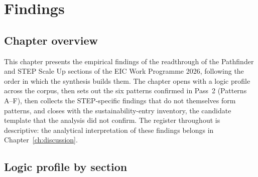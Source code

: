 %
%
\chapter{Findings}
\label{ch:results}

\section*{Chapter overview}

This chapter presents the empirical findings of the readthrough of the
Pathfinder and STEP Scale Up sections of the EIC Work Programme 2026,
following the order in which the synthesis builds them. The chapter
opens with a logic profile across the corpus, then sets out the six
patterns confirmed in Pass~2 (Patterns A--F), then collects the
STEP-specific findings that do not themselves form patterns, and
closes with the sustainability-entry inventory, the candidate template
that the analysis did not confirm. The register throughout is
descriptive: the analytical interpretation of these findings belongs
in Chapter~\ref{ch:discussion}.

\section{Logic profile by section}
\label{sec:res-profile}


